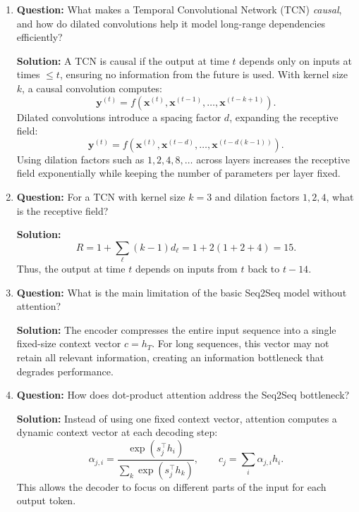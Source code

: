 \documentclass{article}
\begin{document}
\begin{enumerate}


\item \textbf{Question:}
What makes a Temporal Convolutional Network (TCN) \emph{causal}, and how do dilated convolutions help it model long-range dependencies efficiently?

\textbf{Solution:}
A TCN is causal if the output at time $t$ depends only on inputs at times $\le t$, ensuring no information from the future is used. With kernel size $k$, a causal convolution computes:
\[
\mathbf{y}^{(t)} = f(\mathbf{x}^{(t)}, \mathbf{x}^{(t-1)}, \dots, \mathbf{x}^{(t-k+1)}).
\]
Dilated convolutions introduce a spacing factor $d$, expanding the receptive field:
\[
\mathbf{y}^{(t)} = f(\mathbf{x}^{(t)}, \mathbf{x}^{(t-d)}, \dots, \mathbf{x}^{(t-d(k-1))}).
\]
Using dilation factors such as $1,2,4,8,\dots$ across layers increases the receptive field exponentially while keeping the number of parameters per layer fixed.

\item \textbf{Question:}
For a TCN with kernel size $k=3$ and dilation factors $1,2,4$, what is the receptive field?

\textbf{Solution:}
\[
R = 1 + \sum_{\ell}(k-1)d_\ell
= 1 + 2(1+2+4)
= 15.
\]
Thus, the output at time $t$ depends on inputs from $t$ back to $t-14$.


\item \textbf{Question:}
What is the main limitation of the basic Seq2Seq model without attention?

\textbf{Solution:}
The encoder compresses the entire input sequence into a single fixed-size context vector $c = h_T$. For long sequences, this vector may not retain all relevant information, creating an information bottleneck that degrades performance.

\item \textbf{Question:}
How does dot-product attention address the Seq2Seq bottleneck?

\textbf{Solution:}
Instead of using one fixed context vector, attention computes a dynamic context vector at each decoding step:
\[
\alpha_{j,i} = \frac{\exp(s_j^\top h_i)}{\sum_k \exp(s_j^\top h_k)}, 
\qquad
c_j = \sum_i \alpha_{j,i} h_i.
\]
This allows the decoder to focus on different parts of the input for each output token.


\end{enumerate}
\end{document}
